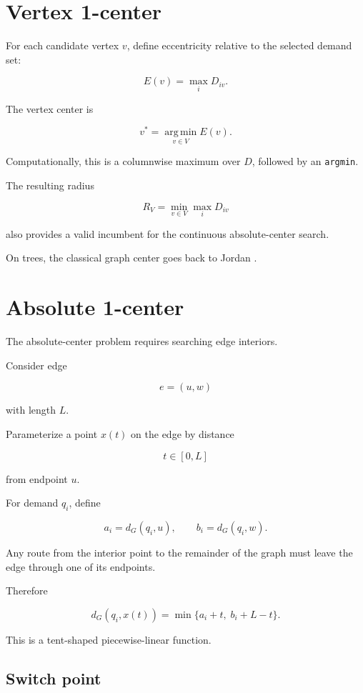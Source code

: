 \documentclass[11pt]{article}
\newcommand{\argmin}{\operatorname*{arg\,min}}
\begin{document}
\section{Vertex 1-center}

For each candidate vertex \(v\), define eccentricity relative to the selected
demand set:

\[
E(v)
=
\max_iD_{iv}.
\]

The vertex center is

\[
v^*
=
\argmin_{v\in V}E(v).
\]

Computationally, this is a columnwise maximum over \(D\), followed by an
\texttt{argmin}.

The resulting radius

\[
R_V
=
\min_{v\in V}\max_iD_{iv}
\]

also provides a valid incumbent for the continuous absolute-center search.

On trees, the classical graph center goes back to Jordan
\cite{Jordan1869}.

\section{Absolute 1-center}

The absolute-center problem requires searching edge interiors.

Consider edge

\[
e=(u,w)
\]

with length \(L\).

Parameterize a point \(x(t)\) on the edge by distance

\[
t\in[0,L]
\]

from endpoint \(u\).

For demand \(q_i\), define

\[
a_i=d_G(q_i,u),
\qquad
b_i=d_G(q_i,w).
\]

Any route from the interior point to the remainder of the graph must leave the
edge through one of its endpoints.

Therefore

\begin{equation}
d_G(q_i,x(t))
=
\min\{a_i+t,\;b_i+L-t\}.
\label{eq:tent}
\end{equation}

This is a tent-shaped piecewise-linear function.

\subsection{Switch point}
\end{document}
